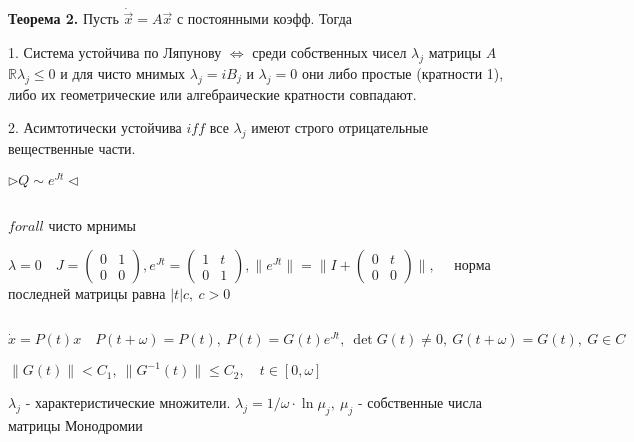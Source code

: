 \documentclass[12pt, a4paper]{article}
\begin{document}
  \pagebreak
  \textbf{Теорема 2.} Пусть $\dot{\vec x} = A\vec{x}$ с постоянными коэфф. Тогда 
  
  1. Система устойчива по Ляпунову $\iff$ среди собственных чисел $\lambda_j$ матрицы $A$ $\mathbb{R}\lambda_j \le 0$ и для чисто мнимых $\lambda_j = iB_j$
  и $\lambda_j = 0$ они либо простые (кратности 1), либо их геометрические или алгебраические кратности совпадают.
  
  2. Асимтотически устойчива $iff$ все $\lambda_j$ имеют строго отрицательные вещественные части.

  $\triangleright  Q \sim e^{Jt} \triangleleft$

  \par $ $

  $forall$ чисто мрнимы

  $\lambda = 0 \quad J = \begin{pmatrix}
    0 & 1\\0 & 0
  \end{pmatrix}, e^{Jt} = \begin{pmatrix}
    1 & t \\ 0 & 1
  \end{pmatrix}, \| e^{Jt} \| = \| I  + \begin{pmatrix}
    0 & t \\ 0 & 0
  \end{pmatrix} \|, \quad$ норма последней матрицы равна $|t| c, \ c>0$ 

  \par $ $

  $\dot x = P(t)x \quad P(t + \omega) = P(t), \ P(t) = G(t)e^{Jt}, \ \det G(t) \neq 0, \ G(t + \omega) = G(t), \ G \in C$

  $\| G(t)\| < C_1 , \ \|G^{-1}(t)\| \le C_2 , \quad t \in [0, \omega]$

  $\lambda_j$ - характеристические множители. $\lambda_j = 1/\omega \cdot \ln \mu_j, \ \mu_j$ - собственные числа матрицы Монодромии
\end{document}
